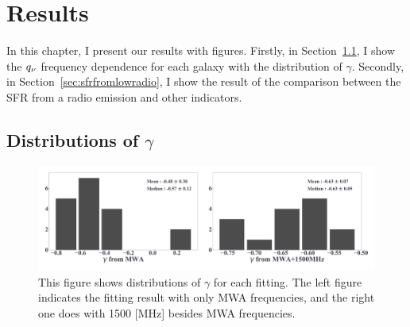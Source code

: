 \chapter{Results}\label{chap:results}
\begin{chapabstract}

In this chapter, I present our results with figures.
Firstly, in Section~\ref{sec:GammaDistribution}, I show the $q_{\nu}$ frequency dependence for each galaxy with the distribution of $\gamma$.
Secondly, in Section~\ref{sec:sfrfromlowradio}, I show the result of the comparison between the SFR from a radio emission and other indicators.

\end{chapabstract}


%

\section{Distributions of $\gamma$}\label{sec:GammaDistribution}

\begin{figure}[htbp]
	\centering
	\includegraphics[width=\linewidth]{Chapter_5/Figures/Result_comparehist.pdf}
    \caption[Histograms of $\gamma$ from the fitting]{\label{fig:comparehist}
        This figure shows distributions of $\gamma$ for each fitting.
        The left figure indicates the fitting result with only MWA frequencies, and the right one does with 1500 [MHz] besides MWA frequencies.
    }
\end{figure}

